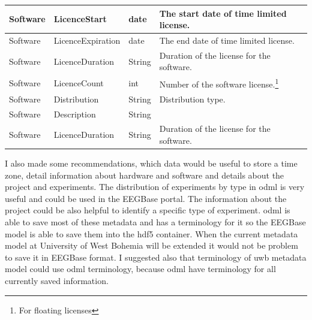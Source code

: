 \begin{longtable}{ | l | l | l | p{5cm} |}
		\hline
		Software & LicenceStart & date & The start date of time limited license.\\ 		\hline
		Software & LicenceExpiration & date & The end date of time limited license.\\ 		\hline
		Software & LicenceDuration & String & Duration of the license for the software.\\ 		\hline
		Software & LicenceCount & int & Number of the software license.\footnote{For floating licenses}\\ 		\hline
		Software & Distribution & String & Distribution type.\\ 		\hline
		Software & Description & String & \\ 		\hline
		Software & LicenceDuration & String & Duration of the license for the software.\\ 		\hline
	\end{longtable} 

I also made some recommendations, which data would be useful to store a time zone, detail information about hardware and software and details about the project and experiments. The distribution of experiments by type in \gls{odml} is very useful and could be used in the EEGBase portal. The information about the project could be also helpful to identify a specific type of experiment. \gls{odml} is able to save most of these metadata and has a terminology for it so the EEGBase model is able to save them into the \gls{hdf5} container. When the current metadata model at University of West Bohemia will be extended it would not be problem to save it in EEGBase format. I suggested also that terminology of \gls{uwb} metadata model could use \gls{odml} terminology, because \gls{odml} have terminology for all currently saved information. 

\newpage
